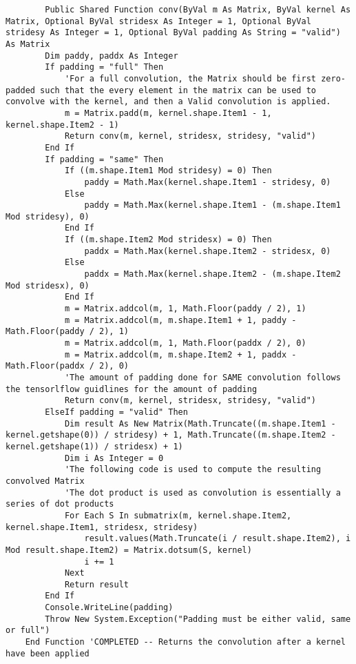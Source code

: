 \begin{verbatim}
        Public Shared Function conv(ByVal m As Matrix, ByVal kernel As Matrix, Optional ByVal stridesx As Integer = 1, Optional ByVal stridesy As Integer = 1, Optional ByVal padding As String = "valid") As Matrix
        Dim paddy, paddx As Integer
        If padding = "full" Then
            'For a full convolution, the Matrix should be first zero-padded such that the every element in the matrix can be used to convolve with the kernel, and then a Valid convolution is applied.
            m = Matrix.padd(m, kernel.shape.Item1 - 1, kernel.shape.Item2 - 1)
            Return conv(m, kernel, stridesx, stridesy, "valid")
        End If
        If padding = "same" Then
            If ((m.shape.Item1 Mod stridesy) = 0) Then
                paddy = Math.Max(kernel.shape.Item1 - stridesy, 0)
            Else
                paddy = Math.Max(kernel.shape.Item1 - (m.shape.Item1 Mod stridesy), 0)
            End If
            If ((m.shape.Item2 Mod stridesx) = 0) Then
                paddx = Math.Max(kernel.shape.Item2 - stridesx, 0)
            Else
                paddx = Math.Max(kernel.shape.Item2 - (m.shape.Item2 Mod stridesx), 0)
            End If
            m = Matrix.addcol(m, 1, Math.Floor(paddy / 2), 1)
            m = Matrix.addcol(m, m.shape.Item1 + 1, paddy - Math.Floor(paddy / 2), 1)
            m = Matrix.addcol(m, 1, Math.Floor(paddx / 2), 0)
            m = Matrix.addcol(m, m.shape.Item2 + 1, paddx - Math.Floor(paddx / 2), 0)
            'The amount of padding done for SAME convolution follows the tensorlflow guidlines for the amount of padding
            Return conv(m, kernel, stridesx, stridesy, "valid")
        ElseIf padding = "valid" Then
            Dim result As New Matrix(Math.Truncate((m.shape.Item1 - kernel.getshape(0)) / stridesy) + 1, Math.Truncate((m.shape.Item2 - kernel.getshape(1)) / stridesx) + 1)
            Dim i As Integer = 0
            'The following code is used to compute the resulting convolved Matrix
            'The dot product is used as convolution is essentially a series of dot products
            For Each S In submatrix(m, kernel.shape.Item2, kernel.shape.Item1, stridesx, stridesy)
                result.values(Math.Truncate(i / result.shape.Item2), i Mod result.shape.Item2) = Matrix.dotsum(S, kernel)
                i += 1
            Next
            Return result
        End If
        Console.WriteLine(padding)
        Throw New System.Exception("Padding must be either valid, same or full")
    End Function 'COMPLETED -- Returns the convolution after a kernel have been applied
    

\end{verbatim}
